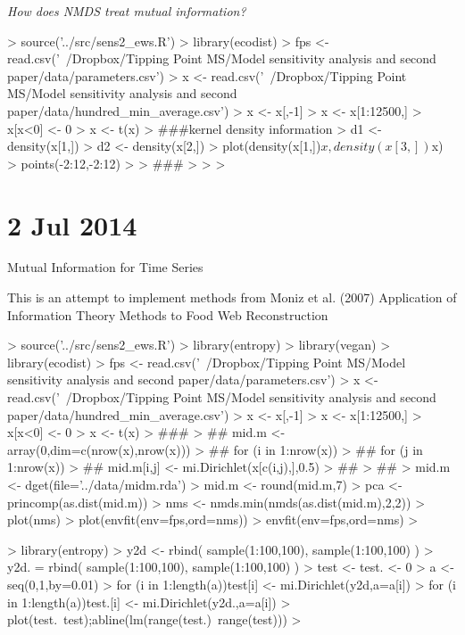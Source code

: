 \documentclass[12pt]{article}
\begin{document}
\textit{How does NMDS treat mutual information?}

\begin{Schunk}
\begin{Sinput}
>   source('../src/sens2_ews.R')
> library(ecodist)
> fps <- read.csv('~/Dropbox/Tipping Point MS/Model sensitivity analysis and second paper/data/parameters.csv') 
> x <- read.csv('~/Dropbox/Tipping Point MS/Model sensitivity analysis and second paper/data/hundred_min_average.csv')
> x <- x[,-1]
> x <- x[1:12500,]
> x[x<0] <- 0
> x <- t(x)
> ###kernel density information
> d1 <- density(x[1,])
> d2 <- density(x[2,])
> plot(density(x[1,])$x,density(x[3,])$x)
> points(-2:12,-2:12)
> 
> ###
> 
> 
> 
\end{Sinput}
\end{Schunk}


\section{2 Jul 2014}

Mutual Information for Time Series

This is an attempt to implement methods from Moniz et al. (2007)
Application of Information Theory Methods to Food Web Reconstruction

\begin{Schunk}
\begin{Sinput}
>   source('../src/sens2_ews.R')
> library(entropy)
> library(vegan)
> library(ecodist)
> fps <- read.csv('~/Dropbox/Tipping Point MS/Model sensitivity analysis and second paper/data/parameters.csv') 
> x <- read.csv('~/Dropbox/Tipping Point MS/Model sensitivity analysis and second paper/data/hundred_min_average.csv')
> x <- x[,-1]
> x <- x[1:12500,]
> x[x<0] <- 0
> x <- t(x)
> ###
> ## mid.m <- array(0,dim=c(nrow(x),nrow(x)))
> ## for (i in 1:nrow(x)){
> ##   for (j in 1:nrow(x)){
> ##     mid.m[i,j] <- mi.Dirichlet(x[c(i,j),],0.5)
> ##   }
> ## }
> mid.m <- dget(file='../data/midm.rda')
> mid.m <- round(mid.m,7)
> pca <- princomp(as.dist(mid.m))
> nms <- nmds.min(nmds(as.dist(mid.m),2,2))
> plot(nms)
> plot(envfit(env=fps,ord=nms))
> envfit(env=fps,ord=nms)
> 
\end{Sinput}
\end{Schunk}

\begin{Schunk}
\begin{Sinput}
>   library(entropy)
> y2d <- rbind( sample(1:100,100), sample(1:100,100) )
> y2d. = rbind( sample(1:100,100), sample(1:100,100) )
> test <- test. <- 0
> a <- seq(0,1,by=0.01)
> for (i in 1:length(a)){test[i] <- mi.Dirichlet(y2d,a=a[i])}
> for (i in 1:length(a)){test.[i] <- mi.Dirichlet(y2d.,a=a[i])}
> plot(test.~test);abline(lm(range(test.)~range(test)))
> 
\end{Sinput}
\end{Schunk}
\end{document}
